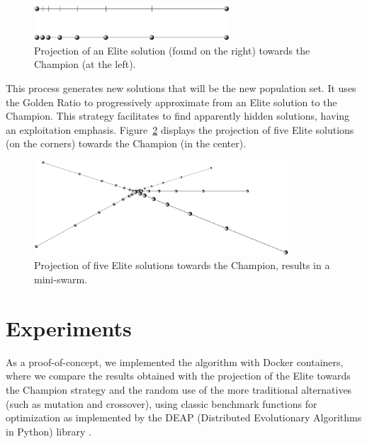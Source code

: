 \documentclass[graybox]{svmult}
\begin{document}
        \begin{figure}
            \centering
            \includegraphics[width=0.65\textwidth]{img/fig_elite_projection.pdf}
            \caption{Projection of an Elite solution (found on the right) towards the Champion (at the left).} \label{fig.elite_projection}
            \end{figure}

        This process generates new solutions that will be the new population set. It
        uses the Golden Ratio to progressively approximate from an Elite solution to
        the Champion. This strategy facilitates to find apparently hidden solutions,
        having an exploitation emphasis. Figure~\ref{fig.elite_projection_swarm}
        displays the projection of five Elite solutions (on the corners) towards the
        Champion (in the center).

        \begin{figure}
            \centering
            \includegraphics[width=0.85\textwidth]{img/fig_elite_projection_swarm.pdf}
            \caption{Projection of five Elite solutions towards the Champion, results in a mini-swarm.} \label{fig.elite_projection_swarm}
            \end{figure}
        
        \FloatBarrier

\section{Experiments}
    \label{section.experiments}

    As a proof-of-concept, we implemented the algorithm with Docker containers,
    where we compare the results obtained with the projection of the Elite towards
    the Champion strategy and the random use of the more traditional alternatives
    (such as mutation and crossover), using classic benchmark functions for
    optimization as implemented by the DEAP (Distributed Evolutionary Algorithms in
    Python) library \cite{fortin2012deap}.
\end{document}
